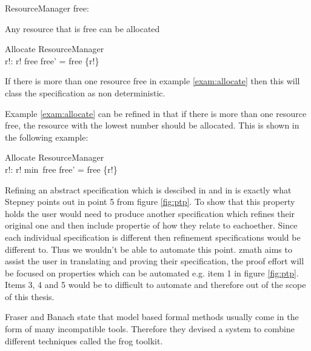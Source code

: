 \begin{exam}

\begin{schema}{ResourceManager}
free:  \nat
\end{schema}

 Any resource that is free can be allocated

\begin{schema}{Allocate}
\Delta ResourceManager \\
r!: \nat
\where
r! \in free \land free' = free \setminus \{r!\}
\end{schema}

\label{exam:allocate} 
\end{exam}

If there is more than one resource free in example \ref{exam:allocate} then this will class the specification as non deterministic.

Example \ref{exam:allocate} can be refined in that if there is more than one resource free, the resource with the lowest number should be allocated. This is shown in the following example:

\begin{exam}

\begin{schema}{Allocate}
\Delta ResourceManager \\
r!: \nat
\where
r! \in min~free \land free' = free \setminus \{r!\}
\end{schema}
\label{exam:allocaterefine} 
\end{exam}

Refining an abstract specification which is descibed in \cite{Woodcock:1996:UZS:235337} and in \cite{spiveyreferencemanual} is exactly what Stepney points out in point 5 from figure \ref{fig:ptp}. To show that this property holds the user would need to produce another specification which refines their original one and then include propertie of how they relate to eachoether. Since each individual specification is different then refinement specifications would be different to. Thus we wouldn't be able to automate this point. \gls{zmath} aims to assist the user in translating and proving their specification, the proof effort will be focused on properties which can be automated e.g. item 1 in figure \ref{fig:ptp}. Items 3, 4 and 5 would be to difficult to automate and therefore out of the scope of this thesis.

Fraser and Banach \cite{DBLP:conf/sefm/FraserB07} state that model based formal methods usually come in the form of many incompatible tools. Therefore they devised a system to combine different techniques called the frog toolkit.

